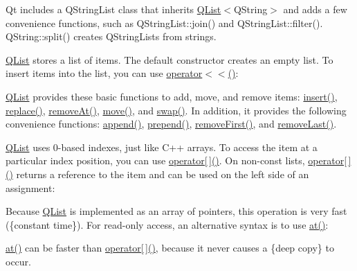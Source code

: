 \begin{DoxyCodeInclude}
\end{DoxyCodeInclude}
 Qt includes a Q\+String\+List class that inherits \hyperlink{class_q_list}{Q\+List}$<$Q\+String$>$ and adds a few convenience functions, such as Q\+String\+List\+::join() and Q\+String\+List\+::filter(). Q\+String\+::split() creates Q\+String\+Lists from strings.

\hyperlink{class_q_list}{Q\+List} stores a list of items. The default constructor creates an empty list. To insert items into the list, you can use \hyperlink{class_q_list_ac2346b83b0fce8b70836bd7a660ec346}{operator$<$$<$()}\+:


\begin{DoxyCodeInclude}
\end{DoxyCodeInclude}
 \hyperlink{class_q_list}{Q\+List} provides these basic functions to add, move, and remove items\+: \hyperlink{class_q_list_a2ae4b66fdb5875c4c55eb903fa5ca25b}{insert()}, \hyperlink{class_q_list_ab39c49b508cf66371cc536c2bc3fb544}{replace()}, \hyperlink{class_q_list_a318a24dd49568516ad82cc341fe1aada}{remove\+At()}, \hyperlink{class_q_list_a19a4be38371f5a6b340b246a247b1f67}{move()}, and \hyperlink{class_q_list_a0db2f46bd41dd9ce5553f0be73825eb6}{swap()}. In addition, it provides the following convenience functions\+: \hyperlink{class_q_list_a3a1e18c5fb9cc04324825a46540638c5}{append()}, \hyperlink{class_q_list_a3d6003bfe5d2e7495df9dae2902743d0}{prepend()}, \hyperlink{class_q_list_a46dbbac39b9f24f1d4432a40dfea58e7}{remove\+First()}, and \hyperlink{class_q_list_a755672d6b82fc61e949a5b803b531855}{remove\+Last()}.

\hyperlink{class_q_list}{Q\+List} uses 0-\/based indexes, just like C++ arrays. To access the item at a particular index position, you can use \hyperlink{class_q_list_ac143057ba0fa5934e704e5ff638339d4}{operator\mbox{[}$\,$\mbox{]}()}. On non-\/const lists, \hyperlink{class_q_list_ac143057ba0fa5934e704e5ff638339d4}{operator\mbox{[}$\,$\mbox{]}()} returns a reference to the item and can be used on the left side of an assignment\+:


\begin{DoxyCodeInclude}
\end{DoxyCodeInclude}
 Because \hyperlink{class_q_list}{Q\+List} is implemented as an array of pointers, this operation is very fast (\{constant time\}). For read-\/only access, an alternative syntax is to use \hyperlink{class_q_list_a0cc68a58145ae69d679da558f4d5e849}{at()}\+:


\begin{DoxyCodeInclude}
\end{DoxyCodeInclude}
 \hyperlink{class_q_list_a0cc68a58145ae69d679da558f4d5e849}{at()} can be faster than \hyperlink{class_q_list_ac143057ba0fa5934e704e5ff638339d4}{operator\mbox{[}$\,$\mbox{]}()}, because it never causes a \{deep copy\} to occur.

